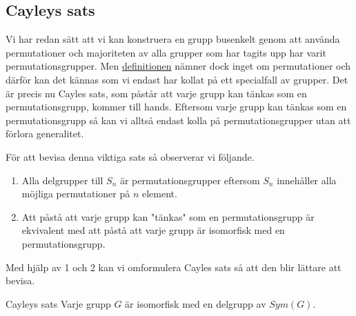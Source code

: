 \documentclass{article}
\theoremstyle{definition}
\begin{document}
\subsection{Cayleys sats}
Vi har redan sätt att vi kan konstruera en grupp busenkelt genom att använda permutationer
och majoriteten av alla grupper som har tagits upp har varit permutationsgrupper. Men 
\hyperlink{def4.1}{definitionen} nämner dock inget om permutationer och därför 
kan det kännas som vi endast har kollat på ett specialfall av grupper. Det är precis nu 
Cayles sats, som påstår att varje grupp kan tänkas som en permutationsgrupp, kommer till hands. 
Eftersom varje grupp kan tänkas som en permutationsgrupp så kan vi alltså endast kolla 
på permutationsgrupper utan att förlora generalitet.

För att bevisa denna viktiga sats så observerar vi följande.
\begin{enumerate}
  \item Alla delgrupper till $S_n$ är permutationsgrupper eftersom $S_n$ 
  innehåller alla möjliga permutationer på $n$ element.
  \item Att påstå att varje grupp kan "tänkas" som en permutationsgrupp är ekvivalent 
  med att påstå att varje grupp är isomorfisk med en permutationsgrupp.
\end{enumerate}
Med hjälp av 1 och 2 kan vi omformulera Cayles sats så att den blir lättare att bevisa. 
\begin{mytheo}{Cayleys sats}{}
  Varje grupp $G$ är isomorfisk med en delgrupp av $Sym(G)$.
\end{mytheo}
\end{document}
